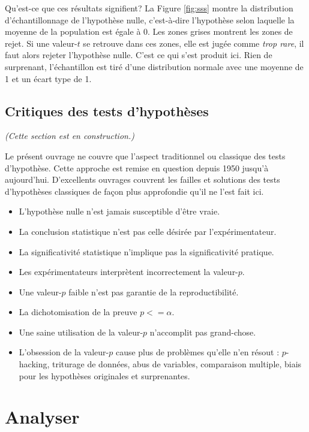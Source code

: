 \documentclass[
]{book}
\providecommand{\tightlist}{%
  \setlength{\itemsep}{0pt}\setlength{\parskip}{0pt}}
\begin{document}
Qu'est-ce que ces résultats signifient? La Figure \ref{fig:sss} montre la distribution d'échantillonnage de l'hypothèse nulle, c'est-à-dire l'hypothèse selon laquelle la moyenne de la population est égale à 0. Les zones grises montrent les zones de rejet. Si une valeur-\(t\) se retrouve dans ces zones, elle est jugée comme \emph{trop rare}, il faut alors rejeter l'hypothèse nulle. C'est ce qui s'est produit ici. Rien de surprenant, l'échantillon est tiré d'une distribution normale avec une moyenne de 1 et un écart type de 1.

\hypertarget{critiques-des-tests-dhypothuxe8ses}{%
\section{Critiques des tests d'hypothèses}\label{critiques-des-tests-dhypothuxe8ses}}

\emph{(Cette section est en construction.)}

Le présent ouvrage ne couvre que l'aspect traditionnel ou classique des tests d'hypothèse. Cette approche est remise en question depuis 1950 jusqu'à aujourd'hui. D'excellents ouvrages couvrent les failles et solutions des tests d'hypothèses classiques de façon plus approfondie qu'il ne l'est fait ici.

\begin{itemize}
\tightlist
\item
  L'hypothèse nulle n'est jamais susceptible d'être vraie.
\item
  La conclusion statistique n'est pas celle désirée par l'expérimentateur.
\item
  La significativité statistique n'implique pas la significativité pratique.
\item
  Les expérimentateurs interprètent incorrectement la valeur-\(p\).
\item
  Une valeur-\(p\) faible n'est pas garantie de la reproductibilité.
\item
  La dichotomisation de la preuve \(p<=\alpha\).
\item
  Une saine utilisation de la valeur-\(p\) n'accomplit pas grand-chose.
\item
  L'obsession de la valeur-\(p\) cause plus de problèmes qu'elle n'en résout : \(p\)-hacking, triturage de données, abus de variables, comparaison multiple, biais pour les hypothèses originales et surprenantes.
\end{itemize}

\hypertarget{analyser}{%
\chapter{Analyser}\label{analyser}}
\end{document}
